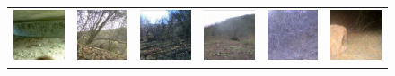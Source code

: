 \begin{figure}[htp!]
\begin{tabularx}{.8\textwidth}{Y Y Y !{\hspace{.05\textwidth}} Y Y Y}
        \includegraphics{gfx/unconditional-diffusion-sampling-caltech-qual/rgb_5860ef9d-23d2-11e8-a6a3-ec086b02610b.jpg} & \includegraphics{gfx/unconditional-diffusion-sampling-caltech-qual/rgb_58629181-23d2-11e8-a6a3-ec086b02610b.jpg} & \includegraphics{gfx/unconditional-diffusion-sampling-caltech-qual/rgb_58629415-23d2-11e8-a6a3-ec086b02610b.jpg} & \includegraphics{gfx/unconditional-diffusion-sampling-caltech-qual/diffusion_00008.png} & \includegraphics{gfx/unconditional-diffusion-sampling-caltech-qual/diffusion_00007.png} & \includegraphics{gfx/unconditional-diffusion-sampling-caltech-qual/diffusion_00006.png}

\end{tabularx}
\end{figure}
